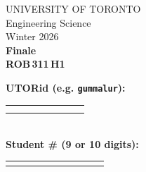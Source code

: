 \documentclass[12pt]{article}
\begin{document}
\noindent
\begin{minipage}{0.45\textwidth}
\large
\noindent  UNIVERSITY OF TORONTO\\
  Engineering Science\\[1.75ex]
  Winter 2026\\[1.75ex]
  \textbf{Finale} \\
  \textbf{{ROB\,311\,H1}}
\end{minipage}%
\hspace{-1cm}
\begin{minipage}{0.6\textwidth}
\raggedleft
\textbf{UTORid (e.g. \texttt{gummalur}):} \\[1ex]
\begin{tabular}{|c|c|c|c|c|c|c|c|}
  \hline
  \hspace{1.2em}\; & \hspace{1.2em}\; & \hspace{1.2em}\; & \hspace{1.2em}\; & \hspace{1.2em}\; & \hspace{1.2em}\; & \hspace{1.2em}\; & \hspace{1.2em}\; \\
  \hspace{1.2em}\; & \hspace{1.2em}\; & \hspace{1.2em}\; & \hspace{1.2em}\; & \hspace{1.2em}\; & \hspace{1.2em}\; & \hspace{1.2em}\; & \hspace{1.2em}\;\\
  \hline
\end{tabular}\\[2ex]
\textbf{Student \# (9 or 10 digits):} \\[1ex]
\begin{tabular}{|c|c|c|c|c|c|c|c|c|c|}
  \hline
  \hspace{1.2em}\; & \hspace{1.2em}\; & \hspace{1.2em}\; & \hspace{1.2em}\; & \hspace{1.2em}\; & \hspace{1.2em}\; & \hspace{1.2em}\; & \hspace{1.2em}\; & \hspace{1.2em}\; & \hspace{1.2em}\; \\

\end{tabular}
\end{minipage}
\end{document}

